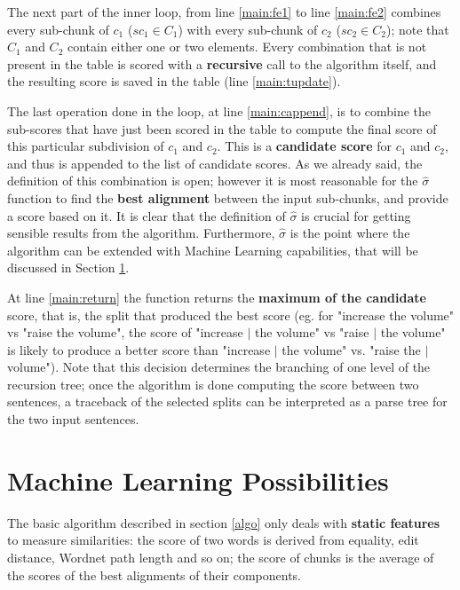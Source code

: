 The next part of the inner loop, from line \ref{main:fe1} to line \ref{main:fe2} combines every sub-chunk of $c_1$ ($sc_1 \in C_1$) with every sub-chunk of $c_2$ ($sc_2 \in C_2$); note that $C_1$ and $C_2$ contain either one or two elements. Every combination that is not present in the table is scored with a \textbf{recursive} call to the algorithm itself, and the resulting score is saved in the table (line \ref{main:tupdate}).

The last operation done in the loop, at line \ref{main:cappend}, is to combine the sub-scores that have just been scored in the table to compute the final score of this particular subdivision of $c_1$ and $c_2$. This is a \textbf{candidate score} for $c_1$ and $c_2$, and thus is appended to the list of candidate scores. As we already said, the definition of this combination is open; however it is most reasonable for the $\hat{\sigma}$ function to find the \textbf{best alignment} between the input sub-chunks, and provide a score based on it. It is clear that the definition of $\hat{\sigma}$ is crucial for getting sensible results from the algorithm. Furthermore, $\hat{\sigma}$ is the point where the algorithm can be extended with Machine Learning capabilities, that will be discussed in Section \ref{learning}.

At line \ref{main:return} the function returns the \textbf{maximum of the candidate} score, that is, the split that produced the best score (eg. for "increase the volume" vs "raise the volume", the score of "increase $\vert$ the volume" vs "raise $\vert$ the volume" is likely to produce a better score than "increase $\vert$ the volume" vs. "raise the $\vert$ volume"). Note that this decision determines the branching of one level of the recursion tree; once the algorithm is done computing the score between two sentences, a traceback of the selected splits can be interpreted as a parse tree for the two input sentences.


\section{Machine Learning Possibilities} \label{learning}
The basic algorithm described in section \ref{algo} only deals with \textbf{static features} to measure similarities: the score of two words is derived from equality, edit distance, Wordnet path length and so on; the score of chunks is the average of the scores of the best alignments of their components.

